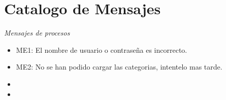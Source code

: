 \chapter{Catalogo de Mensajes}

\textit{\large Mensajes de procesos }
	\begin{itemize}
		\item ME1: El nombre de usuario o contraseña es incorrecto.
		\item ME2: No se han podido cargar las categorias, intentelo mas tarde.
		\item 
		\item 
	\end{itemize}